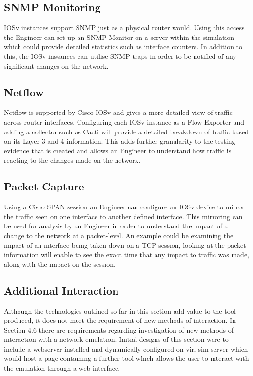 \documentclass[11pt]{report}
\begin{document}
\subsection{SNMP Monitoring}

IOSv instances support SNMP just as a physical router would. Using this access the Engineer can set up an SNMP Monitor on a server within the simulation which could provide detailed statistics such as interface counters. In addition to this, the IOSv instances can utilise SNMP traps in order to be notified of any significant changes on the network.

\subsection{Netflow}

Netflow is supported by Cisco IOSv and gives a more detailed view of traffic across router interfaces. Configuring each IOSv instance as a Flow Exporter and adding a collector such as Cacti will provide a detailed breakdown of traffic based on its Layer 3 and 4 information. This adds further granularity to the testing evidence that is created and allows an Engineer to understand how traffic is reacting to the changes made on the network.

\subsection{Packet Capture}

Using a Cisco SPAN session an Engineer can configure an IOSv device to mirror the traffic seen on one interface to another defined interface. This mirroring can be used for analysis by an Engineer in order to understand the impact of a change to the network at a packet-level. An example could be examining the impact of an interface being taken down on a TCP session, looking at the packet information will enable to see the exact time that any impact to traffic was made, along with the impact on the session. 

\subsection{Additional Interaction}

Although the technologies outlined so far in this section add value to the tool produced, it does not meet the  requirement of new methods of interaction. In Section 4.6 there are requirements regarding investigation of new methods of interaction with a network emulation. Initial designs of this section were to include a webserver installed and dynamically configured on virl-sim-server which would host a page containing a further tool which allows the user to interact with the emulation through a web interface.
\end{document}
